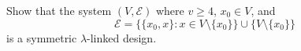Show that the system $(V, \mathcal{E})$ where $v \geq 4$, $x_0 \in V$, and
$$\mathcal{E} = \{ \{x_0, x\} : x \in V \setminus \{x_0\} \} \cup \{V \setminus \{x_0\}\}$$
is a symmetric $\lambda$-linked design.
